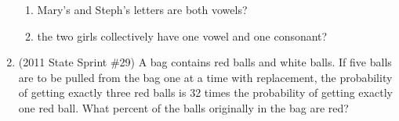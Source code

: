 \documentclass{article}
\begin{document}
\begin{enumerate}
\begin{enumerate}
\item Mary's and Steph's letters are both vowels?
\item the two girls collectively have one vowel and one consonant?\vspace{1cm}
\end{enumerate}
\item (2011 State Sprint \#29) A bag contains red balls and white balls. If five balls are to be pulled from the bag one at a time with replacement, the probability of getting exactly three red balls is 32 times the probability of getting exactly one red ball. What percent of the balls originally in the bag are red?
\end{enumerate} 






\newpage
\end{document}

